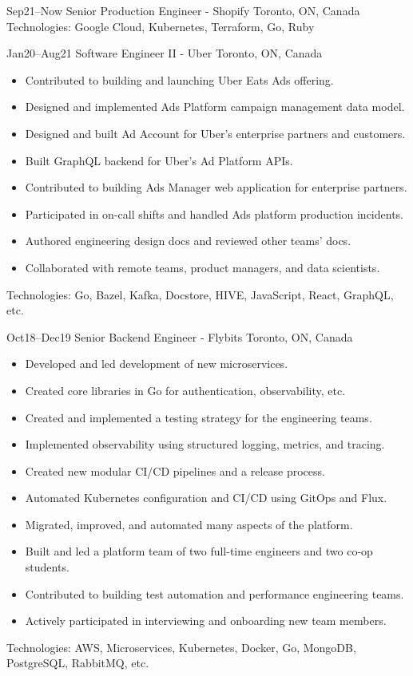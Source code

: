 \documentclass[]{cv-style}                     %
\begin{document}
\begin{entrylist}

  \entry
  {\small Sep21--Now}
  {Senior Production Engineer - Shopify}
  {Toronto, ON, Canada}
  {
    Technologies: Google Cloud, Kubernetes, Terraform, Go, Ruby
  }

  \entry
  {\small Jan20--Aug21}
  {Software Engineer II - Uber}
  {Toronto, ON, Canada}
  {
    \begin{itemize}
      \item Contributed to building and launching Uber Eats Ads offering.
      \item Designed and implemented Ads Platform campaign management data model.
      \item Designed and built Ad Account for Uber's enterprise partners and customers.
      \item Built GraphQL backend for Uber's Ad Platform APIs.
      \item Contributed to building Ads Manager web application for enterprise partners.
      \item Participated in on-call shifts and handled Ads platform production incidents.
      \item Authored engineering design docs and reviewed other teams' docs.
      \item Collaborated with remote teams, product managers, and data scientists.
    \end{itemize}
    Technologies: Go, Bazel, Kafka, Docstore, HIVE, JavaScript, React, GraphQL, etc.
  }

  \entry
  {\small Oct18--Dec19}
  {Senior Backend Engineer - Flybits}
  {Toronto, ON, Canada}
  {
    \begin{itemize}
      \item Developed and led development of new microservices.
      \item Created core libraries in Go for authentication, observability, etc.
      \item Created and implemented a testing strategy for the engineering teams.
      \item Implemented observability using structured logging, metrics, and tracing.
      \item Created new modular CI/CD pipelines and a release process.
      \item Automated Kubernetes configuration and CI/CD using GitOps and Flux.
      \item Migrated, improved, and automated many aspects of the platform.
      \item Built and led a platform team of two full-time engineers and two co-op students.
      \item Contributed to building test automation and performance engineering teams.
      \item Actively participated in interviewing and onboarding new team members.
    \end{itemize}
    Technologies: AWS, Microservices, Kubernetes, Docker, Go, MongoDB, PostgreSQL, RabbitMQ, etc.
  }


\end{entrylist}
\end{document}
